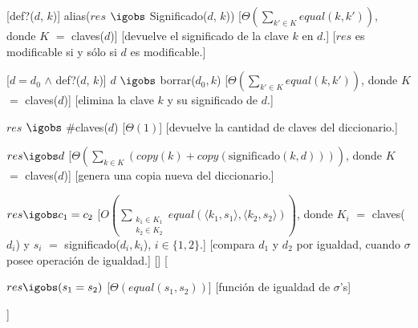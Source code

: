 \documentclass[a4paper,10pt]{article}
\begin{document}
\begin{Interfaz}
  [def?($d$, $k$)]
  {alias($res$ $\igobs$ Significado($d$, $k$))}
  [$\Theta(\sum_{k' \in K}equal(k,k'))$, donde $K$ $=$ claves($d$)]
  [devuelve el significado de la clave $k$ en $d$.]
  [$res$ es modificable si y sólo si $d$ es modificable.]

  [$d = d_0$ $\land$ def?($d$, $k$)]
  {$d$ $\igobs$ borrar($d_0, k$)}
  [$\Theta(\sum_{k' \in K}equal(k,k'))$, donde $K$ $=$ claves($d$)]
  [elimina la clave $k$ y su significado de $d$.]

  {$res$ $\igobs$ \#claves($d$)}
  [$\Theta(1)$]
  [devuelve la cantidad de claves del diccionario.]

  {$res \igobs d$}
  [$\displaystyle\Theta\left(\sum_{k \in K}\left(copy(k) + copy(\text{significado}(k,d))\right)\right)$, donde $K$ $=$ claves($d$)]
  [genera una copia nueva del diccionario.]

  {$res \igobs c_1 = c_2$}
  [$\displaystyle O\left(\sum_{\substack{k_1 \in K_1\\k_2\in K_2}}equal(\langle k_1,s_1\rangle, \langle k_2, s_2 \rangle)\right)$, donde $K_i$ $=$ claves($d_i$) y $s_i$ $=$ significado($d_i, k_i$), $i \in \{1,2\}$.]
  [compara $d_1$ y $d_2$ por igualdad, cuando $\sigma$ posee operación de igualdad.]
  []%
  [{\parbox[t]{\textwidth-3cm}{%
    {$res \igobs (s_1 = s_2)$}
    [$\Theta(equal(s_1, s_2))$]
    [función de igualdad de $\sigma$'s]
  }}]




    ~


\end{Interfaz}
\end{document}
